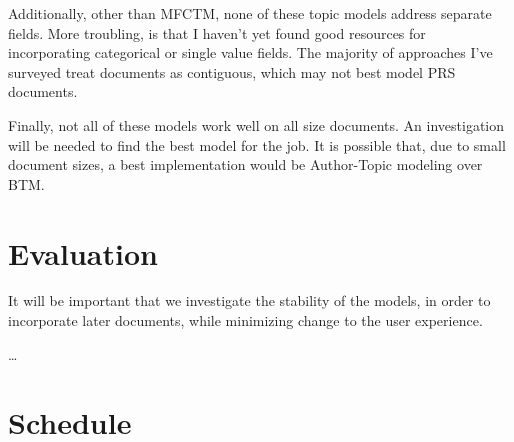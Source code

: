\documentclass{article}
\begin{document}
\begin{multicols}{2}
Additionally, other than MFCTM\cite{Salomatin2009MultifieldCT}, none of these topic models
address separate fields. More troubling, is that I haven't yet found good resources for
incorporating categorical or single value fields. The majority of approaches I've surveyed
treat documents as contiguous, which may not best model PRS documents.

Finally, not all of these models work well on all size documents. An investigation will
be needed to find the best model for the job. It is possible that, due to small document
sizes, a best implementation would be Author-Topic modeling over BTM.

\section{Evaluation}

It will be important that we investigate the stability of the models\cite{Yang2016}, in order
to incorporate later documents, while minimizing change to the user experience.

\dots
\begin{comment}
In order to evaluate our model, we will need to have training and test SME sets. In
order to establish these, I propose a test and training set split by bisecting by
min-cut\cite{Feige2002} a graph where authors are vertices, and edges exist for each
co-authors relationship.
\end{comment}

\section{Schedule}


\end{multicols}
\end{document}
